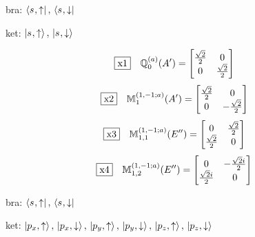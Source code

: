 \documentclass[fleqn,10pt,landscape]{jsarticle}
\begin{document}
\vspace{5mm}

\noindent\textbullet\, bra: $\bra{s_{},\uparrow},\, \bra{s_{},\downarrow}$

\noindent\textbullet\, ket: $\ket{s_{},\uparrow},\, \ket{s_{},\downarrow}$

\begin{dmath*}
\fbox{x1}\quad \mathbb{Q}_{0}^{(a)}(A^{\prime})=\begin{bmatrix} \frac{\sqrt{2}}{2} & 0 \\ 0 & \frac{\sqrt{2}}{2} \end{bmatrix}
\end{dmath*}
\begin{dmath*}
\fbox{x2}\quad \mathbb{M}_{1}^{(1,-1;a)}(A^{\prime})=\begin{bmatrix} \frac{\sqrt{2}}{2} & 0 \\ 0 & - \frac{\sqrt{2}}{2} \end{bmatrix}
\end{dmath*}
\begin{dmath*}
\fbox{x3}\quad \mathbb{M}_{1,1}^{(1,-1;a)}(E^{\prime\prime})=\begin{bmatrix} 0 & \frac{\sqrt{2}}{2} \\ \frac{\sqrt{2}}{2} & 0 \end{bmatrix}
\end{dmath*}
\begin{dmath*}
\fbox{x4}\quad \mathbb{M}_{1,2}^{(1,-1;a)}(E^{\prime\prime})=\begin{bmatrix} 0 & - \frac{\sqrt{2} i}{2} \\ \frac{\sqrt{2} i}{2} & 0 \end{bmatrix}
\end{dmath*}
\vspace{5mm}

\noindent\textbullet\, bra: $\bra{s_{},\uparrow},\, \bra{s_{},\downarrow}$

\noindent\textbullet\, ket: $\ket{p_{x},\uparrow},\, \ket{p_{x},\downarrow},\, \ket{p_{y},\uparrow},\, \ket{p_{y},\downarrow},\, \ket{p_{z},\uparrow},\, \ket{p_{z},\downarrow}$
\end{document}
